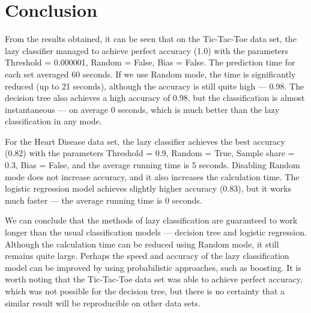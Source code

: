 \documentclass{article}
\begin{document}
\section{Conclusion}

From the results obtained, it can be seen that on the Tic-Tac-Toe data set, the lazy classifier managed to achieve perfect accuracy (1.0) with the parameters Threshold = 0.000001, Random = False, Bias = False. The prediction time for each set averaged 60 seconds. If we use Random mode, the time is significantly reduced (up to 21 seconds), although the accuracy is still quite high --- 0.98. The decision tree also achieves a high accuracy of 0.98, but the classification is almost instantaneous --- on average 0 seconds, which is much better than the lazy classification in any mode.

For the Heart Disease data set, the lazy classifier achieves the best accuracy (0.82) with the parameters Threshold = 0.9, Random = True, Sample share = 0.3, Bias = False, and the average running time is 5 seconds. Disabling Random mode does not increase accuracy, and it also increases the calculation time. The logistic regression model achieves slightly higher accuracy (0.83), but it works much faster --- the average running time is 0 seconds.

We can conclude that the methods of lazy classification are guaranteed to work longer than the usual classification models --- decision tree and logistic regression. Although the calculation time can be reduced using Random mode, it still remains quite large. Perhaps the speed and accuracy of the lazy classification model can be improved by using probabilistic approaches, such as boosting. It is worth noting that the Tic-Tac-Toe data set was able to achieve perfect accuracy, which was not possible for the decision tree, but there is no certainty that a similar result will be reproducible on other data sets.
\end{document}
